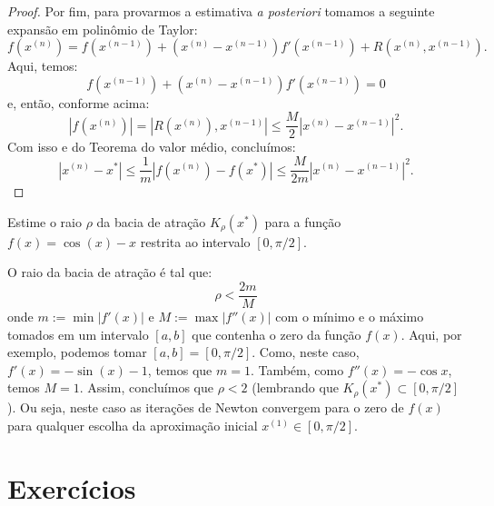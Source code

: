 \begin{proof}
Por fim, para provarmos a estimativa \emph{a posteriori} tomamos a seguinte expansão em polinômio de Taylor:
\begin{equation*}
  f(x^{(n)}) = f(x^{(n-1)}) + (x^{(n)} - x^{(n-1)})f'(x^{(n-1)}) + R(x^{(n)},x^{(n-1)}).
\end{equation*}
Aqui, temos:
\begin{equation*}
  f(x^{(n-1)}) + (x^{(n)} - x^{(n-1)})f'(x^{(n-1)}) = 0
\end{equation*}
e, então, conforme acima:
\begin{equation*}
  |f(x^{(n)})| = |R(x^{(n)}),x^{(n-1)}| \leq \frac{M}{2}|x^{(n)} - x^{(n-1)}|^2.
\end{equation*}
Com isso e do Teorema do valor médio, concluímos:
\begin{equation*}
  |x^{(n)} - x^*| \leq \frac{1}{m}|f(x^{(n)}) - f(x^*)| \leq \frac{M}{2m}|x^{(n)} - x^{(n-1)}|^2.
\end{equation*}
\end{proof}

\begin{ex}
  Estime o raio $\rho$ da bacia de atração $K_\rho(x^*)$ para a função $f(x) = \cos(x) - x$ restrita ao intervalo $[0, \pi/2]$.
\end{ex}
\begin{sol}
  O raio da bacia de atração é tal que:
  \begin{equation*}
    \rho < \frac{2m}{M}
  \end{equation*}
onde $m := \min |f'(x)|$ e $M := \max |f''(x)|$ com o mínimo e o máximo tomados em um intervalo $[a, b]$ que contenha o zero da função $f(x)$. Aqui, por exemplo, podemos tomar $[a, b] = [0, \pi/2]$. Como, neste caso, $f'(x) = -\sin(x) - 1$, temos que $m = 1$. Também, como $f''(x) = -\cos x$, temos $M = 1$. Assim, concluímos que $\rho < 2$ (lembrando que $K_\rho(x^*)\subset [0, \pi/2]$). Ou seja, neste caso as iterações de Newton convergem para o zero de $f(x)$ para qualquer escolha da aproximação inicial $x^{(1)}\in [0, \pi/2]$.
\end{sol}

\section*{Exercícios}


